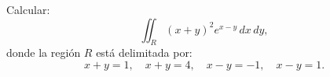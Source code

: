 Calcular:
\[
\iint_R (x+y)^2 e^{x-y} \, dx \, dy,
\]
donde la región \( R \) está delimitada por:
\[
x + y = 1, \quad x + y = 4, \quad x - y = -1, \quad x - y = 1.
\]